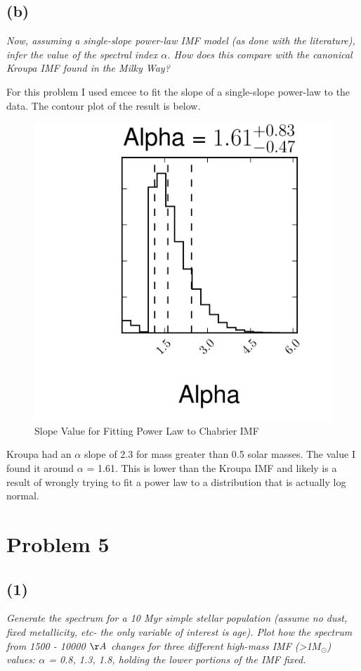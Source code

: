 \documentclass[english,11pt]{article}
\begin{document}
\subsection*{(b)}
\textit{Now, assuming a single-slope power-law IMF model (as done with the literature), infer the value of the spectral index $\alpha$. How does this compare with the canonical Kroupa IMF found in the Milky Way?}

For this problem I used emcee to fit the slope of a single-slope power-law to the data. The contour plot of the result is below.

\begin{figure}[H]
\centering
\caption{Slope Value for Fitting Power Law to Chabrier IMF}
\includegraphics[scale = 0.6]{corner_plot_emcee_prob4.png}
\end{figure}
Kroupa had an $\alpha$ slope of 2.3 for mass greater than 0.5 solar masses. The value I found it around $\alpha$ = 1.61. This is lower than the Kroupa IMF and likely is a result of wrongly trying to fit a power law to a distribution that is actually log normal.

\section*{Problem 5}

\subsection*{(1)}
\textit{Generate the spectrum for a 10 Myr simple stellar population (assume no dust, fixed metallicity, etc- the only variable of interest is age). Plot how the spectrum from 1500 - 10000 $\AA$ changes for three different high-mass IMF (>1$M_{\odot}$) values: $\alpha$ = 0.8, 1.3, 1.8, holding the lower portions of the IMF fixed.}\\
\end{document}
